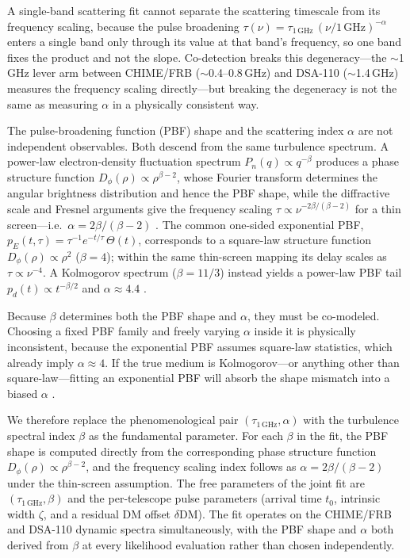 A single-band scattering fit cannot separate the scattering timescale from its
frequency scaling, because the pulse broadening
$\tau(\nu)=\tau_{1\,\mathrm{GHz}}\,(\nu/1\,\mathrm{GHz})^{-\alpha}$ enters a
single band only through its value at that band's frequency, so one band fixes
the product and not the slope. Co-detection breaks this degeneracy---the $\sim$1\,GHz
lever arm between CHIME/FRB ($\sim$0.4--0.8\,GHz) and DSA-110
($\sim$1.4\,GHz) measures the frequency scaling directly---but breaking the
degeneracy is not the same as measuring $\alpha$ in a physically consistent way.

The pulse-broadening function (PBF) shape and the scattering index $\alpha$ are
not independent observables. Both descend from the same turbulence spectrum. A
power-law electron-density fluctuation spectrum
$P_n(q)\propto q^{-\beta}$ produces a phase structure function
$D_\phi(\rho)\propto\rho^{\beta-2}$, whose Fourier transform determines the
angular brightness distribution and hence the PBF shape, while the diffractive
scale and Fresnel arguments give the frequency scaling
$\tau\propto\nu^{-2\beta/(\beta-2)}$ for a thin screen---i.e.\
$\alpha=2\beta/(\beta-2)$ \citep{Rickett1990, Cordes2025}. The common
one-sided exponential PBF,
$p_E(t,\tau)=\tau^{-1}e^{-t/\tau}\,\Theta(t)$, corresponds to a square-law
structure function $D_\phi(\rho)\propto\rho^2$ ($\beta=4$); within the same
thin-screen mapping its delay scales as $\tau\propto\nu^{-4}$. A Kolmogorov
spectrum ($\beta=11/3$) instead yields a
power-law PBF tail $p_d(t)\propto t^{-\beta/2}$ and $\alpha\approx4.4$
\citep{Cordes2025}.

Because $\beta$ determines both the PBF shape and $\alpha$, they must be
co-modeled. Choosing a fixed PBF family and freely varying $\alpha$ inside it
is physically inconsistent, because the exponential PBF assumes square-law
statistics, which already imply $\alpha\approx4$. If the true medium is
Kolmogorov---or anything other than square-law---fitting an exponential PBF
will absorb the shape mismatch into a biased $\alpha$ \citep{Cordes2025}.

We therefore replace the phenomenological pair $(\tau_{1\,\mathrm{GHz}},\alpha)$
with the turbulence spectral index $\beta$ as the fundamental parameter. For
each $\beta$ in the fit, the PBF shape is computed directly from the
corresponding phase structure function $D_\phi(\rho)\propto\rho^{\beta-2}$, and
the frequency scaling index follows as $\alpha=2\beta/(\beta-2)$ under the
thin-screen assumption. The free parameters of the joint fit are
$(\tau_{1\,\mathrm{GHz}},\beta)$ and the per-telescope pulse parameters
(arrival time $t_0$, intrinsic width $\zeta$, and a residual DM offset
$\delta\mathrm{DM}$). The fit operates on the CHIME/FRB and DSA-110 dynamic
spectra simultaneously, with the PBF shape and $\alpha$ both derived from
$\beta$ at every likelihood evaluation rather than chosen independently.

